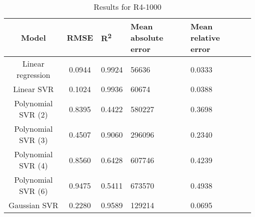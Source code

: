 \begin{table}[H]
\centering
\begin{adjustbox}{center}
\begin{tabular}{c | c M{1.2cm} M{2.5cm} M{2.5cm} M{1.8cm}}
Model & RMSE & R\textsuperscript{2} & Mean absolute error & Mean relative error \tabularnewline
\hline
Linear regression & 0.0944 & 0.9924 &  56636 & 0.0333 \\
Linear SVR & 0.1024 & 0.9936 &  60674 & 0.0388 \\
Polynomial SVR (2) & 0.8395 & 0.4422 & 580227 & 0.3698 \\
Polynomial SVR (3) & 0.4507 & 0.9060 & 296096 & 0.2340 \\
Polynomial SVR (4) & 0.8560 & 0.6428 & 607746 & 0.4239 \\
Polynomial SVR (6) & 0.9475 & 0.5411 & 673570 & 0.4938 \\
Gaussian SVR & 0.2280 & 0.9589 & 129214 & 0.0695 \\
\end{tabular}
\end{adjustbox}
\\
\caption{Results for R4-1000}
\label{tab:coreonly_linear_R4_1000}
\end{table}
